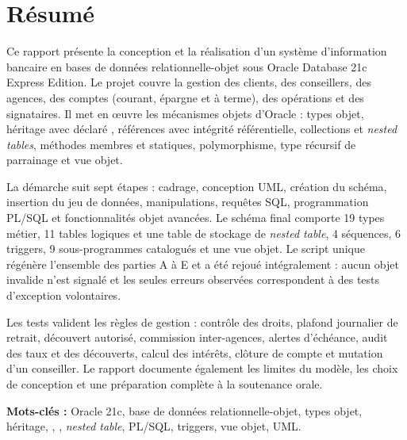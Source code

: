 \chapter*{Résumé}

Ce rapport présente la conception et la réalisation d'un système d'information bancaire
en bases de données relationnelle-objet sous Oracle Database 21c Express Edition.
Le projet couvre la gestion des clients, des conseillers, des agences, des comptes
(courant, épargne et à terme), des opérations et des signataires. Il met en œuvre
les mécanismes objets d'Oracle : types objet, héritage avec 
déclaré , références  avec intégrité
référentielle, collections  et \emph{nested tables}, méthodes membres
et statiques, polymorphisme, type récursif de parrainage et vue objet.

La démarche suit sept étapes : cadrage, conception UML, création du schéma,
insertion du jeu de données, manipulations, requêtes SQL, programmation PL/SQL
et fonctionnalités objet avancées. Le schéma final comporte 19 types métier,
11 tables logiques et une table de stockage de \emph{nested table}, 4 séquences,
6 triggers, 9 sous-programmes catalogués et une vue objet. Le script unique
 régénère l'ensemble des parties A à E et a été
rejoué intégralement : aucun objet invalide n'est signalé et les seules erreurs
 observées correspondent à des tests d'exception volontaires.

Les tests valident les règles de gestion : contrôle des droits, plafond journalier
de retrait, découvert autorisé, commission inter-agences, alertes d'échéance,
audit des taux et des découverts, calcul des intérêts, clôture de compte et
mutation d'un conseiller. Le rapport documente également les limites du modèle,
les choix de conception et une préparation complète à la soutenance orale.

\vspace{0.5cm}
\noindent\textbf{Mots-clés :} Oracle 21c, base de données relationnelle-objet,
types objet, héritage, , , \emph{nested table}, PL/SQL,
triggers, vue objet, UML.

\clearpage

